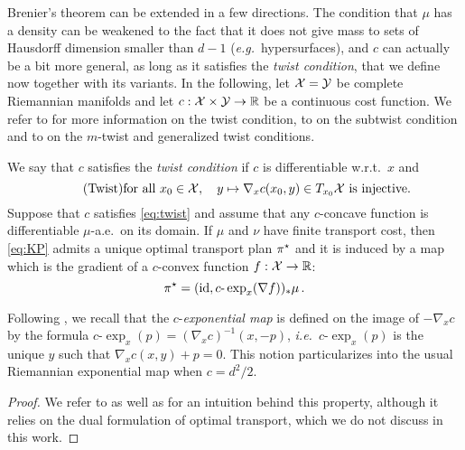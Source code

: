         Brenier's theorem can be extended in a few directions. The condition that $\mu$ has a density can be weakened to the fact that it does not give mass to sets of Hausdorff dimension smaller than $d-1$ (\textit{e.g.}~hypersurfaces), and $c$ can actually be a bit more general, as long as it satisfies the \emph{twist condition}, that we define now together with its variants.
        In the following, let $\mathcal{X}=\mathcal{Y}$ be complete Riemannian manifolds and let $c:\mathcal{X}\times\mathcal{Y}\to \mathbb{R}$ be a continuous cost function. We refer to \cite{mccann2011five,chiappori2010hedonic,villani2009optimal} for more information on the twist condition, to \cite{ahmad2011optimal,mccann2012glimpse} on the subtwist condition and to \cite{moameni2016characterization} on the $m$-twist and generalized twist conditions.
        \begin{proposition}[Twist]
            \label{prop:twist}
            We say that $c$ satisfies the \emph{twist condition} if $c$ is differentiable w.r.t.~$x$ and
            \begin{equation}
                \tag{Twist}
                \text{for all }x_0\in\mathcal X,\quad  y\mapsto \nabla_x c(x_0,y)\in T_{x_0}\mathcal{X} \text{ is injective.}
                \label{eq:twist}
            \end{equation}
            Suppose that $c$ satisfies \cref{eq:twist} and assume that any $c$-concave function is differentiable $\mu$-a.e.~on its domain. If $\mu$ and $\nu$ have finite transport cost, then \cref{eq:KP} admits a unique optimal transport plan $\pi^\star$ and it is induced by a map which is the gradient of a $c$-convex function $f:\mathcal{X}\to\mathbb{R}$:
            $$\pi^\star=(\operatorname{id},c\text{-}\exp_x(\nabla f))_*\mu\,.$$
        \end{proposition}
        \begin{remark}
            Following \cite{mccann2011five,villani2009optimal}, we recall that the $c$-\emph{exponential map} is defined on the image of $-\nabla_xc$ by the formula $c$-$\exp_x(p)=(\nabla_x c)^{-1}(x,-p)$, \textit{i.e.}~$c$-$\exp_x(p)$ is the unique $y$ such that $\nabla_xc(x,y)+p=0$. This notion particularizes into the usual Riemannian exponential map when $c=d^2/2$.
        \end{remark}
        \begin{proof}
            We refer to \cite[Chap.~10]{villani2009optimal} as well as \cite[Sec.~1.3]{santambrogio2015optimal} for an intuition behind this property, although it relies on the dual formulation of optimal transport, which we do not discuss in this work.
        \end{proof}
